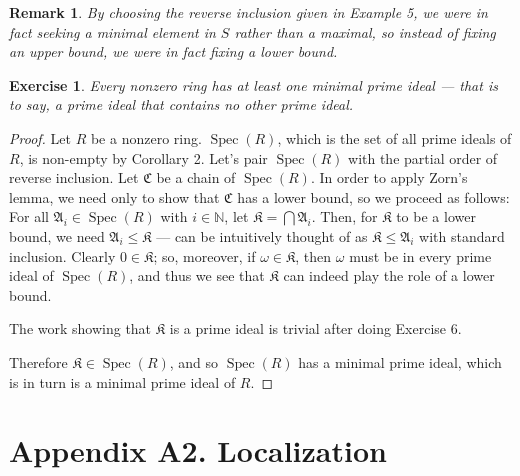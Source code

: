 \documentclass[12pt,reqno]{amsart}
\theoremstyle{plain}
\newtheorem{exercise}{Exercise}
\newtheorem{rem}{Remark}
\DeclareMathOperator{\spec}{Spec}
\newcommand{\nn}{\mathbb N}
\newcommand{\idealA}{\mathfrak{A}}
\newcommand{\ccc}{\mathfrak{C}}
\begin{document}
\begin{rem} By choosing the reverse inclusion given in Example 5, we were in fact seeking a minimal element in $S$ rather than a maximal, so instead of fixing an upper bound, we were in fact fixing a lower bound. 
\end{rem}
\begin{exercise} Every nonzero ring has at least one minimal prime ideal — that is to say, a prime ideal that contains no other prime ideal. 
\end{exercise} 
\begin{proof}
Let $R$ be a nonzero ring. $\spec (R)$, which is the set of all prime ideals of $R$, is non-empty by Corollary 2. Let's pair $\spec (R)$ with the partial order of reverse inclusion. 
Let $\ccc$ be a chain of $\spec(R)$. In order to apply Zorn's lemma, we need only to show that $\ccc$ has a lower bound, so we proceed as follows: For all $\idealA_i \in \spec (R)$ with $i \in \nn$, let $\mathfrak{K} = \bigcap \idealA_i$. Then, for $\mathfrak{K}$ to be a lower bound, we need $ \idealA_i \leq \mathfrak{K}$ — can be intuitively thought of as $\mathfrak{K} \leq \idealA_i$ with standard inclusion. Clearly $0 \in \mathfrak{K}$; so, moreover, if $\omega \in \mathfrak{K}$, then $\omega$ must be in every prime ideal of $\spec (R)$, and thus we see that $\mathfrak{K}$ can indeed play the role of a lower bound. 

The work showing that $\mathfrak{K}$ is a prime ideal is trivial after doing Exercise 6. 

Therefore $\mathfrak{K} \in \spec(R)$, and so $\spec(R)$ has a minimal prime ideal, which is in turn is a minimal prime ideal of $R$.  
\end{proof}
\section{Appendix A2. Localization}
\end{document}

